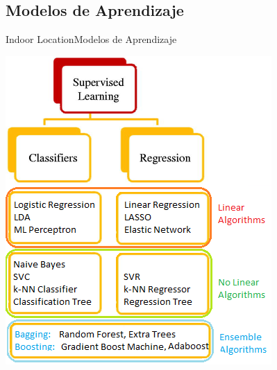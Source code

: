 \documentclass[10pt]{beamer}
\begin{document}
\subsection{Modelos de Aprendizaje}
\begin{frame}{Indoor Location}{Modelos de Aprendizaje}
\begin{center}
\includegraphics[scale=0.6]{AAUgraphics/map}
\end{center}

\end{frame}
\end{document}
